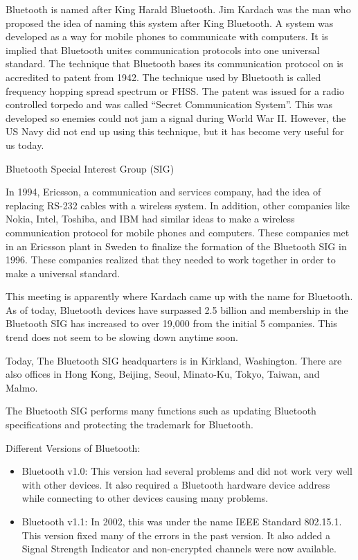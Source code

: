 \documentclass[11pt,a4paper]{article}
\begin{document}
	 {Bluetooth is named after King Harald Bluetooth. Jim Kardach was the man who proposed the idea of naming this system after King Bluetooth. A system was developed as a way for mobile phones to communicate with computers. It is implied that Bluetooth unites communication protocols into one universal standard.
	 The technique that Bluetooth bases its communication protocol on is accredited to patent from 1942. The technique used by Bluetooth is called frequency hopping spread spectrum or FHSS. The patent was issued for a radio controlled torpedo and was called “Secret Communication System”. This was developed so enemies could not jam a signal during World War II. However, the US Navy did not end up using this technique, but it has become very useful for us today.

Bluetooth Special Interest Group (SIG)

In 1994, Ericsson, a communication and services company, had the idea of replacing RS-232 cables with a wireless system. In addition, other companies like Nokia, Intel, Toshiba, and IBM had similar ideas to make a wireless communication protocol for mobile phones and computers. These companies met in an Ericsson plant in Sweden to finalize the formation of the Bluetooth SIG in 1996. These companies realized that they needed to work together in order to make a universal standard.

This meeting is apparently where Kardach came up with the name for Bluetooth. As of today, Bluetooth devices have surpassed 2.5 billion and membership in the Bluetooth SIG has increased to over 19,000 from the initial 5 companies. This trend does not seem to be slowing down anytime soon.

Today, The Bluetooth SIG headquarters is in Kirkland, Washington. There are also offices in Hong Kong, Beijing, Seoul, Minato-Ku, Tokyo, Taiwan, and Malmo.

The Bluetooth SIG performs many functions such as updating Bluetooth specifications and protecting the trademark for Bluetooth.

\newpage
Different Versions of Bluetooth:
\begin{itemize}

\item Bluetooth v1.0: This version had several problems and did not work very well with other devices. It also required a Bluetooth hardware device address while connecting to other devices causing many problems.

\item Bluetooth v1.1: In 2002, this was under the name IEEE Standard 802.15.1. This version fixed many of the errors in the past version. It also added a Signal Strength Indicator and non-encrypted channels were now available.


\end{itemize}}
\end{document}
